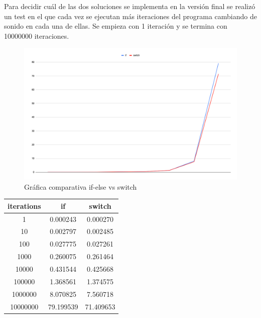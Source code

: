             Para decidir cuál de las dos soluciones se implementa en la versión final se realizó un test en el que cada
            vez se ejecutan más iteraciones del programa cambiando de sonido en cada una de ellas. Se empieza con 1
            iteración y se termina con 10000000 iteraciones.\newline

            \begin{figure}[ht]
                \centering
                \includegraphics[width=\textwidth]{grafica_if_switch}
                \caption{Gráfica comparativa if-else vs switch \label{fig:GraficaIfVsSwitch}}
            \end{figure}

            \begin{center}
                \begin{tabular}{ |c|c|c| }
                    \hline
                        iterations & if & switch \\
                        \hline\hline
                        1 & 0.000243 & 0.000270 \\
                        \hline
                        10 & 0.002797 & 0.002485 \\
                        \hline
                        100 & 0.027775 & 0.027261 \\
                        \hline
                        1000 & 0.260075 & 0.261464 \\
                        \hline
                        10000 & 0.431544 & 0.425668 \\
                        \hline
                        100000 & 1.368561 & 1.374575 \\
                        \hline
                        1000000 & 8.070825 & 7.560718 \\
                        \hline
                        10000000 & 79.199539 & 71.409653 \\
                    \hline
                \end{tabular}
            \end{center}

